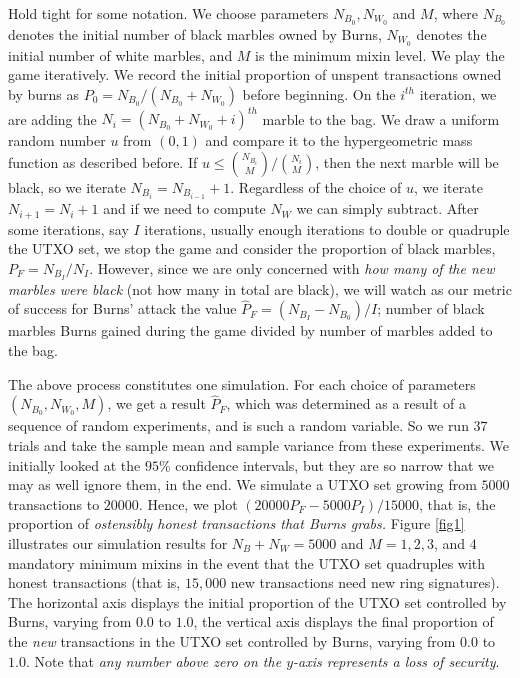 \documentclass{mrl}
\begin{document}
Hold tight for some notation. We choose parameters $N_{B_0}, N_{W_0}$ and $M$, where $N_{B_0}$ denotes the initial number of black marbles owned by Burns, $N_{W_0}$ denotes the initial number of white marbles, and $M$ is the minimum mixin level. We play the game iteratively. We record the initial proportion of unspent transactions owned by burns as $P_0 = N_{B_0}/(N_{B_0} + N_{W_0})$ before beginning. On the $i^{th}$ iteration, we are adding the $N_i = (N_{B_0} + N_{W_0} + i)^{th}$ marble to the bag. We draw a uniform random number $u$ from $(0,1)$ and compare it to the hypergeometric mass function as described before. If $u \leq \binom{N_{B_i}}{M}/\binom{N_i}{M}$, then the next marble will be black, so we iterate $N_{B_i} = N_{B_{i-1}}+1$. Regardless of the choice of $u$, we iterate $N_{i+1} = N_{i} + 1$ and if we need to compute $N_W$ we can simply subtract. After some iterations, say $I$ iterations, usually enough iterations to double or quadruple the UTXO set, we stop the game and consider the proportion of black marbles, $P_F = N_{B_I}/N_I$. However, since we are only concerned with \emph{how many of the new marbles were black} (not how many in total are black), we will watch as our metric of success for Burns' attack the value $\widehat{P}_F = (N_{B_I} - N_{B_0})/I$; number of black marbles Burns gained during the game divided by number of marbles added to the bag.

The above process constitutes one simulation. For each choice of parameters $(N_{B_0}, N_{W_0}, M)$, we get a result $\widehat{P}_F$, which was determined as a result of a sequence of random experiments, and is such a random variable. So we run $37$ trials and take the sample mean and sample variance from these experiments. We initially looked at the $95\%$ confidence intervals, but they are so narrow that we may as well ignore them, in the end. We simulate a UTXO set growing from $5000$ transactions to $20000$. Hence, we plot $(20000P_F - 5000P_I)/15000$, that is, the proportion of \emph{ostensibly honest transactions that Burns grabs.} Figure \ref{fig1} illustrates our simulation results for $N_B+N_W = 5000$ and $M=1, 2, 3$, and $4$ mandatory minimum mixins in the event that the UTXO set quadruples with honest transactions (that is, $15,000$ new transactions need new ring signatures). The horizontal axis displays the initial proportion of the UTXO set controlled by Burns, varying from $0.0$ to $1.0$, the vertical axis displays the final proportion of the \emph{new} transactions in the UTXO set controlled by Burns, varying from $0.0$ to $1.0$. Note that \emph{any number above zero on the $y$-axis represents a loss of security}.
\end{document}
